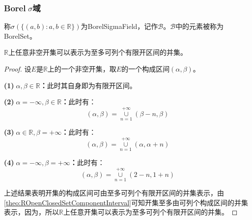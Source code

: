 \subsubsection{Borel$\;\sigma$域}
\begin{definition}
	称$\sigma(\{(a,b):a,b\in\mathbb{R}\})$为\gls{BorelSigmaField}，记作$\mathcal{B}$。$\mathcal{B}$中的元素被称为\gls{BorelSet}。
\end{definition}
\begin{lemma}\label{lem:OpenSet=CountableFiniteOpenSetUnion}
	$\mathbb{R}$上任意非空开集可以表示为至多可列个有限开区间的并集。
\end{lemma}
\begin{proof}
	设$E$是$\mathbb{R}$上的一个非空开集，取$E$的一个构成区间$(\alpha,\beta)$。\par
	\textbf{(1)$\;\alpha,\beta\in\mathbb{R}$：}此时其自身即为有限开区间。\par
	\textbf{(2)$\;\alpha=-\infty,\beta\in\mathbb{R}$：}此时有：
	\begin{equation*}
		(\alpha,\beta)=\underset{n=1}{\overset{+\infty}{\cup}}(\beta-n,\beta)
	\end{equation*}\par
	\textbf{(3)$\;\alpha\in\mathbb{R},\beta=+\infty$：}此时有：
	\begin{equation*}
		(\alpha,\beta)=\underset{n=1}{\overset{+\infty}{\cup}}(\alpha,\alpha+n)
	\end{equation*}\par
	\textbf{(4)$\;\alpha=-\infty,\beta=+\infty$：}此时有：
	\begin{equation*}
		(\alpha,\beta)=\underset{n=1}{\overset{+\infty}{\cup}}(2-n,1+n)
	\end{equation*}\par
	上述结果表明开集的构成区间可由至多可列个有限开区间的并集表示，由\cref{theo:ROpenClosedSetComponentInterval}可知开集至多由可列个构成区间的并集表示，因为，所以$\mathbb{R}$上任意开集可以表示为至多可列个有限开区间的并集。
\end{proof}
